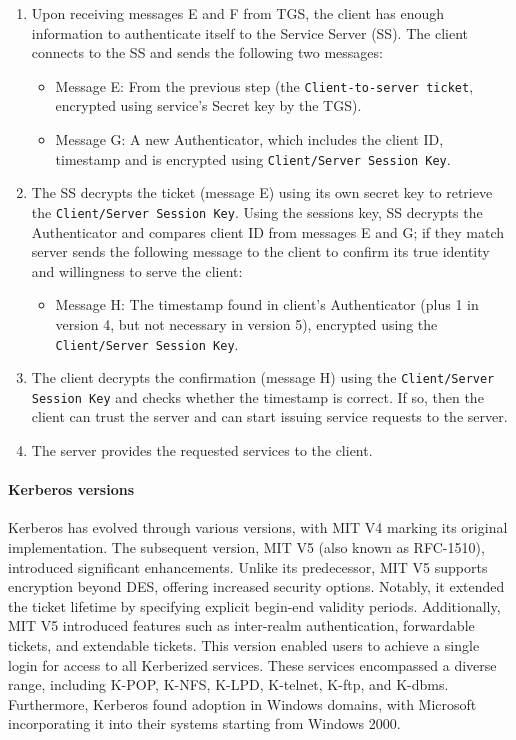 \begin{enumerate}
  \item Upon receiving messages E and F from TGS, the client has enough information to authenticate itself to the Service Server (SS). The client connects to the SS and sends the following two messages:

        \begin{itemize}
          \item Message E: From the previous step (the \texttt{Client-to-server ticket}, encrypted using service's Secret key by the TGS).
          \item Message G: A new Authenticator, which includes the client ID, timestamp and is encrypted using \texttt{Client/Server Session Key}.
        \end{itemize}

  \item  The SS decrypts the ticket (message E) using its own secret key to retrieve the \texttt{Client/Server Session Key}. Using the sessions key, SS decrypts the Authenticator and compares client ID from messages E and G; if they match server sends the following message to the client to confirm its true identity and willingness to serve the client:

        \begin{itemize}
          \item Message H: The timestamp found in client's Authenticator (plus 1 in version 4, but not necessary in version 5), encrypted using the \texttt{Client/Server Session Key}.
        \end{itemize}

  \item The client decrypts the confirmation (message H) using the \texttt{Client/Server Session Key} and checks whether the timestamp is correct. If so, then the client can trust the server and can start issuing service requests to the server.
  \item The server provides the requested services to the client.
\end{enumerate}


\paragraph*{Kerberos versions}
Kerberos has evolved through various versions, with MIT V4 marking its original implementation. The subsequent version, MIT V5 (also known as RFC-1510), introduced significant enhancements.
Unlike its predecessor, MIT V5 supports encryption beyond DES, offering increased security options. Notably, it extended the ticket lifetime by specifying explicit begin-end validity periods.
Additionally, MIT V5 introduced features such as inter-realm authentication, forwardable tickets, and extendable tickets. This version enabled users to achieve a single login for access to all Kerberized services. These services encompassed a diverse range, including K-POP, K-NFS, K-LPD, K-telnet, K-ftp, and K-dbms.
Furthermore, Kerberos found adoption in Windows domains, with Microsoft incorporating it into their systems starting from Windows 2000.

